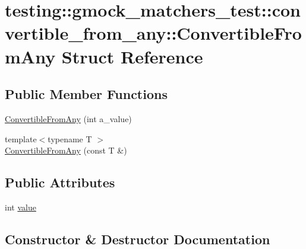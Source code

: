 \hypertarget{structtesting_1_1gmock__matchers__test_1_1convertible__from__any_1_1_convertible_from_any}{}\section{testing\+::gmock\+\_\+matchers\+\_\+test\+::convertible\+\_\+from\+\_\+any\+::Convertible\+From\+Any Struct Reference}
\label{structtesting_1_1gmock__matchers__test_1_1convertible__from__any_1_1_convertible_from_any}
\subsection*{Public Member Functions}
\begin{DoxyCompactItemize}
\item 
\mbox{\hyperlink{structtesting_1_1gmock__matchers__test_1_1convertible__from__any_1_1_convertible_from_any_a5bee1e70fa860c1219928f82006e2b2b}{Convertible\+From\+Any}} (int a\+\_\+value)
\item 
{\footnotesize template$<$typename T $>$ }\\\mbox{\hyperlink{structtesting_1_1gmock__matchers__test_1_1convertible__from__any_1_1_convertible_from_any_a1192b2a272c6ce8e6fc75a9448417a4f}{Convertible\+From\+Any}} (const T \&)
\end{DoxyCompactItemize}
\subsection*{Public Attributes}
\begin{DoxyCompactItemize}
\item 
int \mbox{\hyperlink{structtesting_1_1gmock__matchers__test_1_1convertible__from__any_1_1_convertible_from_any_a4fdd0c9f00eced05d2af01b3cf28889f}{value}}
\end{DoxyCompactItemize}


\subsection{Constructor \& Destructor Documentation}
\mbox{\label{structtesting_1_1gmock__matchers__test_1_1convertible__from__any_1_1_convertible_from_any_a5bee1e70fa860c1219928f82006e2b2b}} 
